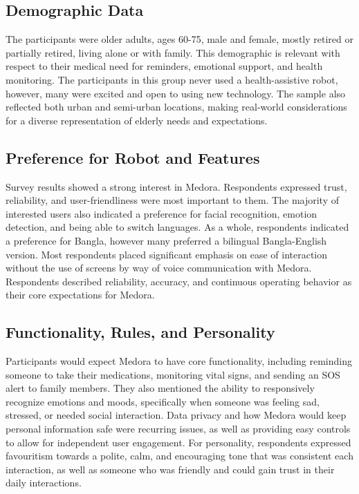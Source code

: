 \subsection{Demographic Data}

The participants were older adults, ages 60-75, male and female, mostly retired or partially retired, living alone or with family. This demographic is relevant with respect to their medical need for reminders, emotional support, and health monitoring. The participants in this group never used a health-assistive robot, however, many were excited and open to using new technology. The sample also reflected both urban and semi-urban locations, making real-world considerations for a diverse representation of elderly needs and expectations.

\subsection{Preference for Robot and Features}
Survey results showed a strong interest in Medora. Respondents expressed trust, reliability, and user-friendliness were most important to them. The majority of interested users also indicated a preference for facial recognition, emotion detection, and being able to switch languages. As a whole, respondents indicated a preference for Bangla, however many preferred a bilingual Bangla-English version. Most respondents placed significant emphasis on ease of interaction without the use of screens by way of voice communication with Medora. Respondents described reliability, accuracy, and continuous operating behavior as their core expectations for Medora.

\subsection{Functionality, Rules, and Personality}

Participants would expect Medora to have core functionality, including reminding someone to take their medications, monitoring vital signs, and sending an SOS alert to family members. They also mentioned the ability to responsively recognize emotions and moods, specifically when someone was feeling sad, stressed, or needed social interaction. Data privacy and how Medora would keep personal information safe were recurring issues, as well as providing easy controls to allow for independent user engagement. For personality, respondents expressed favouritism towards a polite, calm, and encouraging tone that was consistent each interaction, as well as someone who was friendly and could gain trust in their daily interactions.
